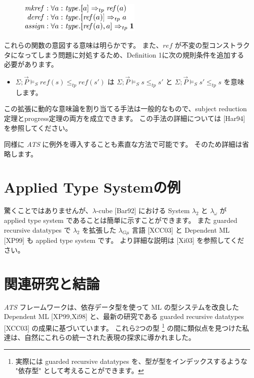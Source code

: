 \documentclass[submit,techreq,noauthor,onecolumn]{ipsj}
\begin{document}
\begin{figure}[h]
\centering
\includegraphics[width=6cm]{img/infig3_effect_dctype.png}
\end{figure}

これらの関数の意図する意味は明らかです。
また、$ref$ が不変の型コンストラクタになってしまう問題に対処するため、Definition 1に次の規則条件を追加する必要があります。

\begin{itemize}
\item $\Sigma; \vec{P} \models_S ref(s) \leq_{tp} ref(s')$ は $\Sigma; \vec{P} \models_S s \leq_{tp} s'$ と $\Sigma; \vec{P} \models_S s' \leq_{tp} s$ を意味します。
\end{itemize}

\noindent この拡張に動的な意味論を割り当てる手法は一般的なもので、subject reduction定理とprogress定理の両方を成立できます。
この手法の詳細については [Har94] を参照してください。

同様に {\it ATS} に例外を導入することも素直な方法で可能です。
そのため詳細は省略します。

\section{Applied Type Systemの例}

驚くことではありませんが、$\lambda$-cube [Bar92] における System $\lambda_2$ と $\lambda_{\omega}$ が applied type system であることは簡単に示すことができます。
また guarded recursive datatypes で $\lambda_2$ を拡張した $\lambda_{G\mu}$ 言語 [XCC03] と Dependent ML [XP99] も applied type system です。
より詳細な説明は [Xi03] を参照してください。

\section{関連研究と結論}

{\it ATS} フレームワークは、依存データ型を使って ML の型システムを改良した Dependent ML [XP99,Xi98] と、最新の研究である guarded recursive datatypes [XCC03] の成果に基づいています。
これら2つの型
\footnote{実際には guarded recursive datatypes を、型が型をインデックスするような "依存型" として考えることができます。}
の間に類似点を見つけた私達は、自然にこれらの統一された表現の探求に導かれました。
\end{document}
